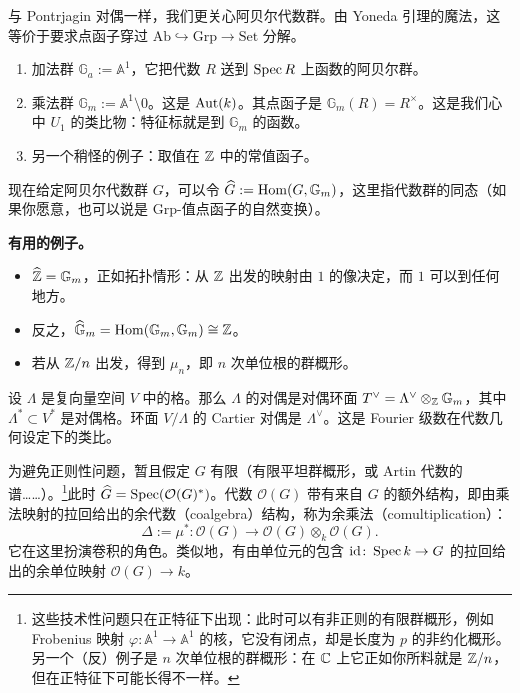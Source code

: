 与 Pontrjagin 对偶一样，我们更关心阿贝尔代数群。由 Yoneda 引理的魔法，这等价于要求点函子穿过 $\mathrm{Ab}\hookrightarrow\mathrm{Grp}\to\mathrm{Set}$ 分解。

\begin{example}
  \begin{enumerate}
    \item 加法群 $\mathbb{G}_a := \mathbb{A}^1$，它把代数 $R$ 送到 $\operatorname{Spec} R$ 上函数的阿贝尔群。
    \item 乘法群 $\mathbb{G}_m := \mathbb{A}^1\setminus 0$。这是 $\operatorname{Aut}(k)$。其点函子是 $\mathbb{G}_m(R) = R^\times$。这是我们心中 $U_1$ 的类比物：特征标就是到 $\mathbb{G}_m$ 的函数。
    \item 另一个稍怪的例子：取值在 $\mathbb{Z}$ 中的常值函子。
  \end{enumerate}
\end{example}

现在给定阿贝尔代数群 $G$，可以令 $\widehat{G} := \operatorname{Hom}(G,\mathbb{G}_m)$，这里指代数群的同态（如果你愿意，也可以说是 $\mathrm{Grp}$-值点函子的自然变换）。

\textbf{有用的例子。}

\begin{itemize}
  \item $\widehat{\mathbb{Z}} = \mathbb{G}_m$，正如拓扑情形：从 $\mathbb{Z}$ 出发的映射由 $1$ 的像决定，而 $1$ 可以到任何地方。
  \item 反之，$\widehat{\mathbb{G}}_m = \operatorname{Hom}(\mathbb{G}_m,\mathbb{G}_m)\cong \mathbb{Z}$。
  \item 若从 $\mathbb{Z}/n$ 出发，得到 $\mu_n$，即 $n$ 次单位根的群概形。
\end{itemize}

设 $\Lambda$ 是复向量空间 $V$ 中的格。那么 $\Lambda$ 的对偶是对偶环面 $T^\vee = \Lambda^\vee\otimes_{\mathbb{Z}} \mathbb{G}_m$，其中 $\Lambda^*\subset V^*$ 是对偶格。环面 $V/\Lambda$ 的 Cartier 对偶是 $\Lambda^\vee$。这是 Fourier 级数在代数几何设定下的类比。


为避免正则性问题，暂且假定 $G$ 有限（有限平坦群概形，或 Artin 代数的谱……）。\footnote{这些技术性问题只在正特征下出现：此时可以有非正则的有限群概形，例如 Frobenius 映射 $\varphi\colon\mathbb{A}^1\to\mathbb{A}^1$ 的核，它没有闭点，却是长度为 $p$ 的非约化概形。另一个（反）例子是 $n$ 次单位根的群概形：在 $\mathbb{C}$ 上它正如你所料就是 $\mathbb{Z}/n$，但在正特征下可能长得不一样。}此时 $\widehat{G} = \operatorname{Spec}(\mathcal{O}(G)^*)$。代数 $\mathcal{O}(G)$ 带有来自 $G$ 的额外结构，即由乘法映射的拉回给出的余代数（coalgebra）结构，称为余乘法（comultiplication）：
\[
  \Delta := \mu^*\colon \mathcal{O}(G)\longrightarrow \mathcal{O}(G)\otimes_k \mathcal{O}(G).
\]
它在这里扮演卷积的角色。类似地，有由单位元的包含 $\operatorname{id}\colon \operatorname{Spec} k\to G$ 的拉回给出的余单位映射 $\mathcal{O}(G)\to k$。

